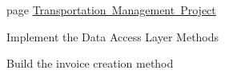 
\begin{DoxyRefList}
\item[page \mbox{\hyperlink{index}{Transportation Management Project}} ]\label{todo__todo000001}%
%
 

Implement the Data Access Layer Methods 

Build the invoice creation method 


\end{DoxyRefList}